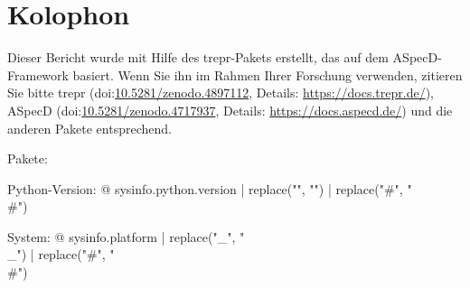 \section*{Kolophon}

Dieser Bericht wurde mit Hilfe des trepr-Pakets erstellt, das auf dem ASpecD-Framework basiert. Wenn Sie ihn im Rahmen Ihrer Forschung verwenden, zitieren Sie bitte trepr (doi:\href{https://doi.org/10.5281/zenodo.4897112}{10.5281/zenodo.4897112}, Details: \url{https://docs.trepr.de/}), ASpecD (doi:\href{https://doi.org/10.5281/zenodo.4717937}{10.5281/zenodo.4717937}, Details: \url{https://docs.aspecd.de/}) und die anderen Pakete entsprechend.

Pakete: %


Python-Version: {@ sysinfo.python.version | replace("\n", "") | replace("#", "\\#") }

System: {@ sysinfo.platform | replace("_", "\\_") | replace("#", "\\#") }
